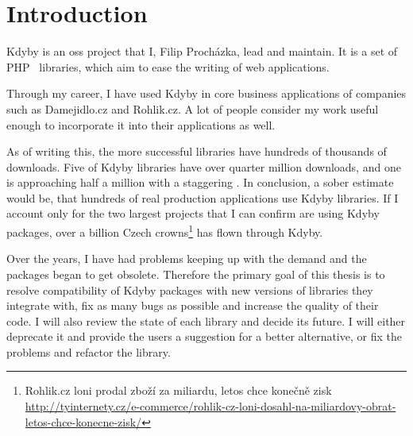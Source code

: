 \chapter{Introduction}

Kdyby is an \gls{oss} project that I, Fi\-li\-p P\-ro\-chá\-z\-ka, lead and maintain. It is a set of PHP~\cite{php:manual:about} libraries, which aim to ease the writing of web applications.

Through my career, I have used Kdyby in core business applications of companies such as Damejidlo.cz and Rohlik.cz. A lot of people consider my work useful enough to incorporate it into their applications as well.

As of writing this, the more successful libraries have hundreds of thousands of downloads. Five of Kdyby libraries have over quarter million downloads, and one is approaching half a million with a staggering . In conclusion, a sober estimate would be, that hundreds of real production applications use Kdyby libraries. If I account only for the two largest projects that I can confirm are using Kdyby packages, over a billion Czech crowns\footnote{Rohlik.cz loni prodal zboží za miliardu, letos chce konečně zisk \\\url{http://tyinternety.cz/e-commerce/rohlik-cz-loni-dosahl-na-miliardovy-obrat-letos-chce-konecne-zisk/}} has flown through Kdyby.

Over the years, I have had problems keeping up with the demand and the packages began to get obsolete. Therefore the primary goal of this thesis is to resolve compatibility of Kdyby packages with new versions of libraries they integrate with, fix as many bugs as possible and increase the quality of their code. I will also review the state of each library and decide its future. I will either deprecate it and provide the users a suggestion for a better alternative, or fix the problems and refactor the library.
